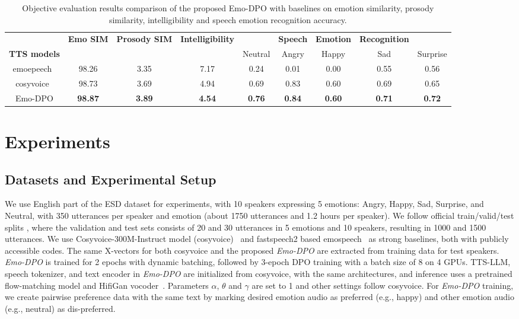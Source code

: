 \documentclass[conference]{IEEEtran}
\begin{document}
\begin{table}
\vspace{-0.3cm}
\centering
\caption{Objective evaluation results comparison of the proposed Emo-DPO with baselines on emotion similarity, prosody similarity, intelligibility and speech emotion recognition accuracy.}
\begin{tabular}{cccc|ccccc}
\toprule
 & \textbf{Emo SIM} & \textbf{Prosody SIM} & \textbf{Intelligibility} &  & \textbf{Speech} & \textbf{Emotion} & \textbf{Recognition} &  \\
\textbf{TTS models} &  &  &  & Neutral & Angry & Happy & Sad & Surprise \\\midrule
emoepeech~\cite{diatlova2023emospeech} & 98.26 & 3.35 & 7.17 & 0.24 & 0.01 & 0.00 & 0.55 & 0.56 \\
cosyvoice~\cite{du2024cosyvoice} & 98.73 & 3.69 & 4.94 & 0.69 & 0.83 & 0.60 & 0.69 & 0.65 \\
Emo-DPO & \textbf{98.87} & \textbf{3.89} & \textbf{4.54} & \textbf{0.76} & \textbf{0.84} & \textbf{0.60} & \textbf{0.71} & \textbf{0.72} \\
\bottomrule
\end{tabular}
\label{objective}
\vspace{-0.2cm}
\end{table}

\section{Experiments}

\subsection{Datasets and Experimental Setup}
We use English part of the ESD dataset \cite{zhou2022emotional} for experiments, with 10 speakers expressing 5 emotions: Angry, Happy, Sad, Surprise, and Neutral, with 350 utterances per speaker and emotion (about 1750 utterances and 1.2 hours per speaker). We follow official train/valid/test splits \cite{zhou2022emotional,diatlova2023emospeech}, where the validation and test sets consists of 20 and 30 utterances in 5 emotions and 10 speakers, resulting in 1000 and 1500 utterances.
We use Cosyvoice-300M-Instruct model (cosyvoice)~\cite{du2024cosyvoice} and fastspeech2 based emospeech~\cite{diatlova2023emospeech} as strong baselines,  both with publicly accessible codes. The same X-vectors for both cosyvoice and the proposed \textit{Emo-DPO} are extracted from training data for test speakers. \textit{Emo-DPO} is trained for 2 epochs with dynamic batching, followed by 3-epoch DPO training with a batch size of 8 on 4 GPUs.  
TTS-LLM, speech tokenizer, and text encoder in \textit{Emo-DPO} are initialized from cosyvoice, with the same architectures, and inference uses a pretrained flow-matching model and HifiGan vocoder~\cite{du2024cosyvoice}. Parameters $\alpha$, $\theta$ and $\gamma$ are set to 1 and other settings follow cosyvoice. For \textit{Emo-DPO} training, we create pairwise preference data with the same text by marking desired emotion audio as preferred (e.g., happy) and other emotion audio (e.g., neutral) as dis-preferred. 
\vspace{-0.3cm}
\end{document}
